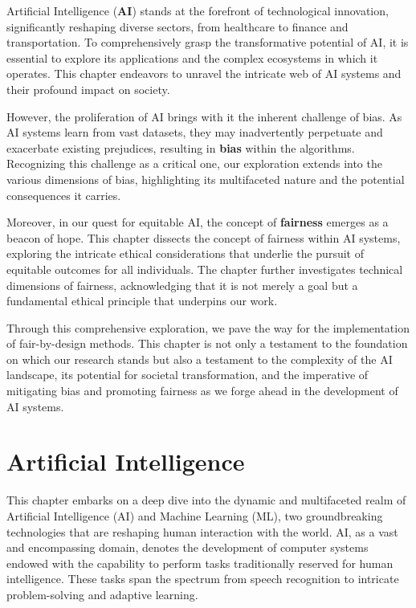 \documentclass[12pt,a4paper,openright,twoside]{book}
\begin{document}
Artificial Intelligence (\textbf{AI}) stands at the forefront of technological innovation, significantly reshaping diverse sectors, from healthcare to finance and transportation. To comprehensively grasp the transformative potential of AI, it is essential to explore its applications and the complex ecosystems in which it operates. This chapter endeavors to unravel the intricate web of AI systems and their profound impact on society.

However, the proliferation of AI brings with it the inherent challenge of bias. As AI systems learn from vast datasets, they may inadvertently perpetuate and exacerbate existing prejudices, resulting in \textbf{bias} within the algorithms. Recognizing this challenge as a critical one, our exploration extends into the various dimensions of bias, highlighting its multifaceted nature and the potential consequences it carries. 

Moreover, in our quest for equitable AI, the concept of \textbf{fairness} emerges as a beacon of hope. This chapter dissects the concept of fairness within AI systems, exploring the intricate ethical considerations that underlie the pursuit of equitable outcomes for all individuals. The chapter further investigates technical dimensions of fairness, acknowledging that it is not merely a goal but a fundamental ethical principle that underpins our work. 

Through this comprehensive exploration, we pave the way for the implementation of fair-by-design methods. This chapter is not only a testament to the foundation on which our research stands but also a testament to the complexity of the AI landscape, its potential for societal transformation, and the imperative of mitigating bias and promoting fairness as we forge ahead in the development of AI systems. 


\section{Artificial Intelligence}
This chapter embarks on a deep dive into the dynamic and multifaceted realm of Artificial Intelligence (AI) and Machine Learning (ML), two groundbreaking technologies that are reshaping human interaction with the world. AI, as a vast and encompassing domain, denotes the development of computer systems endowed with the capability to perform tasks traditionally reserved for human intelligence. These tasks span the spectrum from speech recognition to intricate problem-solving and adaptive learning. 
\end{document}
